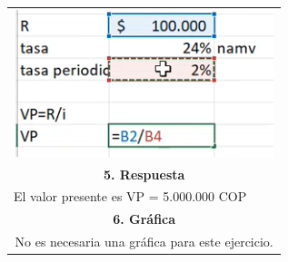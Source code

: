 \begin{center}
\begin{longtable}[H]{|p{0.333\linewidth}|p{0.3333\linewidth}|p{0.3333\linewidth}|}
  \multicolumn{3}{|c|}{ \includegraphics[trim=-5 -5 -5 -5 ,width=1\columnwidth]{8/Ejem8.png}} \\
  \multicolumn{3}{|c|}{\cellcolor[HTML]{FFB183}\textbf{5. Respuesta}}                         \\ \hline
  \multicolumn{3}{|p{\columnwidth}|}{
  El valor presente es VP = 5.000.000 COP
  }                                                                                           \\ \hline
  \multicolumn{3}{|c|}{\cellcolor[HTML]{FFB183}\textbf{6. Gráfica}}                           \\ \hline
  \multicolumn{3}{|c|}{No es necesaria una gráfica para este ejercicio.}                      \\ \hline
 \end{longtable}
\end{center}